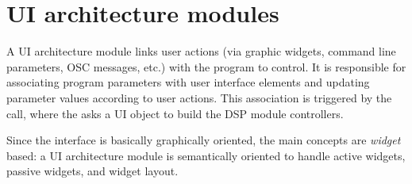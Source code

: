 % 


\section{UI architecture modules} 
\label{gui}

A UI architecture module links user actions (via graphic widgets, command line parameters, OSC messages, etc.) with the \faust program to control. 
It is responsible for associating program parameters with user interface elements and updating parameter values according to user actions. This association is triggered by the  call, where the  asks a UI object to build the DSP module controllers.

Since the interface is basically graphically oriented, the main concepts are \emph{widget} based: a UI architecture module is semantically oriented to handle active widgets, passive widgets, and widget layout.

